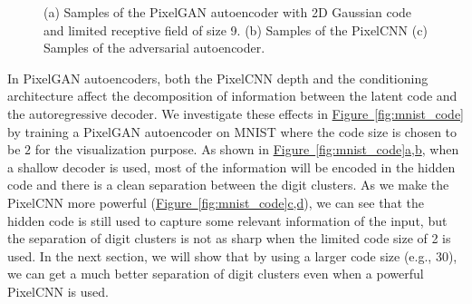 \documentclass{article}
\newcommand{\myfig}[1]{\hyperref[fig:#1]{Figure~\ref*{fig:#1}}}
\newcommand{\myfiggg}[3]{\hyperref[fig:#1]{Figure~\ref*{fig:#1}#2,#3}}
\begin{document}
\begin{figure}[t]
\centering
\hspace*{0.8cm}
\hspace{.13cm}
\hspace*{0.8cm}
\hspace{.13cm}
\hspace*{1cm}
\vspace{-.3cm}
\caption{\label{fig:mnist}(a) Samples of the PixelGAN autoencoder with 2D Gaussian code and limited receptive field of size 9. (b) Samples of the PixelCNN (c) Samples of the adversarial autoencoder.}
\end{figure}


In PixelGAN autoencoders, both the PixelCNN depth and the conditioning architecture affect the decomposition of information between the latent code and the autoregressive decoder. 
We investigate these effects in \myfig{mnist_code} by training a PixelGAN autoencoder on MNIST where the code size is chosen to be $2$ for the visualization purpose. 
As shown in \myfiggg{mnist_code}{a}{b}, when a shallow decoder is used, most of the information will be encoded in the hidden code and there is a clean separation between the digit clusters. As we make the PixelCNN more powerful (\myfiggg{mnist_code}{c}{d}), we can see that the hidden code is still used to capture some relevant information of the input, but the separation of digit clusters is not as sharp when the limited code size of 2 is used. In the next section, we will show that by using a larger code size (e.g., 30), we can get a much better separation of digit clusters even when a powerful PixelCNN is used. 
\end{document}
